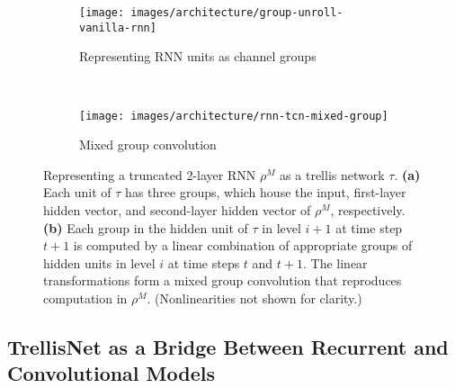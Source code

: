 \documentclass{article} \usepackage{iclr2019_conference,times}
\begin{document}
\begin{figure}[t]
    \vspace{-.4in}
    \centering
    \begin{subfigure}[b]{.49\textwidth}
        \centering
        \texttt{[image: images/architecture/group-unroll-vanilla-rnn]}
        \vspace{-.23in}
        \caption{Representing RNN units as channel groups}
        \label{fig:unrolled-RNN-groups}
    \end{subfigure}
    ~
    \begin{subfigure}[b]{.42\textwidth}
        \centering
        \texttt{[image: images/architecture/rnn-tcn-mixed-group]}
        \vspace{-.21in}
        \caption{Mixed group convolution}
        \label{fig:rnn-tcn-mixed-group}
    \end{subfigure}
    \vspace{-1.5mm}
    \caption{Representing a truncated 2-layer RNN $\rho^M$ as a trellis network $\tau$. {\bf (a)} Each unit of $\tau$ has three groups, which house the input, first-layer hidden vector, and second-layer hidden vector of $\rho^M$, respectively. {\bf (b)} Each group in the hidden unit of $\tau$ in level $i+1$ at time step $t+1$ is computed by a linear combination of appropriate groups of hidden units in level $i$ at time steps $t$ and $t+1$. The linear transformations form a mixed group convolution that reproduces computation in $\rho^M$. (Nonlinearities not shown for clarity.)}
    \vspace{-5mm}
\end{figure}


\subsection{TrellisNet as a Bridge Between Recurrent and Convolutional Models}
\label{subsec:optimize-trellis}
\end{document}

